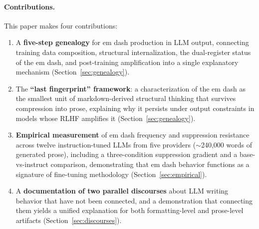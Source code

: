 \paragraph{Contributions.} This paper makes four contributions:

\begin{enumerate}[leftmargin=*]
\item A \textbf{five-step genealogy} for em dash production in LLM output, connecting training data composition, structural internalization, the dual-register status of the em dash, and post-training amplification into a single explanatory mechanism (Section~\ref{sec:genealogy}).

\item The \textbf{``last fingerprint'' framework}: a characterization of the em dash as the smallest unit of markdown-derived structural thinking that survives compression into prose, explaining why it persists under output constraints in models whose RLHF amplifies it (Section~\ref{sec:genealogy}).

\item \textbf{Empirical measurement} of em dash frequency and suppression resistance across twelve instruction-tuned LLMs from five providers ($\sim$240,000 words of generated prose), including a three-condition suppression gradient and a base-vs-instruct comparison, demonstrating that em dash behavior functions as a signature of fine-tuning methodology (Section~\ref{sec:empirical}).

\item A \textbf{documentation of two parallel discourses} about LLM writing behavior that have not been connected, and a demonstration that connecting them yields a unified explanation for both formatting-level and prose-level artifacts (Section~\ref{sec:discourses}).
\end{enumerate}
